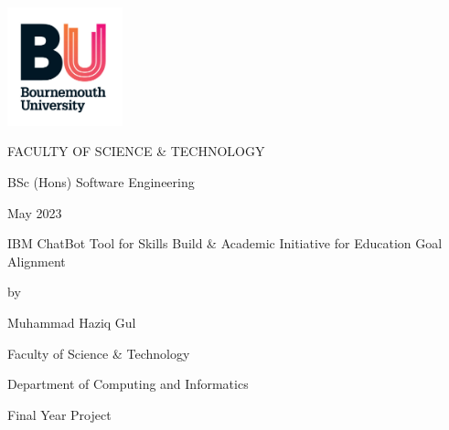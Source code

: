 \begin{titlepage}
    \thisfancypage{%
        \setlength{\fboxrule}{5pt}
        \fbox}{}
    \includegraphics[width=0.25\textwidth]{images/unilogo}\par\vspace{0.25cm}
    \centering
	{\huge \uppercase{Faculty of Science \& Technology} \par}
	\vspace{3cm}
    {\huge BSc (Hons) Software Engineering \par}
    {\huge May 2023 \par}
    \vspace{3cm}
    {\huge IBM ChatBot Tool for Skills Build \& Academic Initiative for Education Goal Alignment \par}
    \vspace{1.5cm}
    {\huge by \par}
    \vspace{1.5cm}
    {\huge Muhammad Haziq Gul \par}
    \thispagestyle{fancy}
    \renewcommand{\headrule}{}

\end{titlepage}
\restoregeometry

\newpage

\pagestyle{fancy}
\fancyhf{}
\fancyhead[R]{\thepage}
\renewcommand{\headrule}{}



\newpage
\vspace*{\fill}
\begingroup
\centering
{\Large
Faculty of Science \& Technology

Department of Computing and Informatics

Final Year Project

}
\endgroup
\vspace*{\fill}
\newpage

